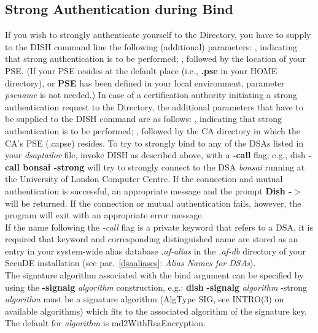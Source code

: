 \subsection{Strong Authentication during Bind}
If you wish to strongly authenticate yourself to the Directory, you have to supply
to the DISH command line the following (additional) parameters:
\bi
{}, indicating that strong authentication is to be performed;
, followed by the location of your PSE. (If your PSE resides
at the default place (i.e., {\bf .pse} in your HOME directory), or {\bf PSE} has been 
defined in your local environment, parameter {\em psename} is not needed.)
\ei
In case of a certification authority initiating a strong authentication request
to the Directory, the additional parameters that have to be supplied to the DISH
command are as follows:
\bi
{}, indicating that strong authentication is to be performed;
, followed by the CA directory in which the CA's PSE (.capse) resides.
\ei
To try to strongly bind to any of the DSAs listed in your {\em dsaptailor} file, invoke DISH as
described above, with a {\bf -call} flag; e.g., dish {\bf -call bonsai -strong} will try
to strongly connect to the DSA {\em bonsai} running at the University of London
Computer Centre. If the connection and mutual authentication is successful, an appropriate message
and the prompt {\bf Dish -$>$} will be returned. If the connection or mutual
authentication fails, however, the program will exit with an appropriate error message.
\\ [1em]
If the name following the {\em -call} flag is a private keyword that refers to a DSA, it is
required that keyword and corresponding distinguished name are stored as an entry in your
system-wide alias database {\em .af-alias} in the {\em .af-db} directory of your SecuDE
installation (see par.~\ref{dsaaliases}: {\em Alias Names for DSAs}).
\\ [1em]
The signature algorithm associated with the bind argument can be specified by using the 
{\bf -signalg} {\em algorithm} construction, e.g.: 
\bvtab
\1 {\bf dish} {\bf -signalg} {\em algorithm} -strong
\evtab
{\em algorithm} must be a signature algorithm (AlgType SIG, see INTRO(3) on available algorithms) 
which fits to the associated algorithm of the signature key. The default for {\em algorithm} is md2WithRsaEncryption.


